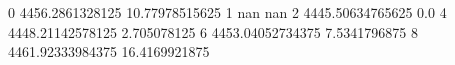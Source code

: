 0 4456.2861328125 10.77978515625
1 nan nan
2 4445.50634765625 0.0
4 4448.21142578125 2.705078125
6 4453.04052734375 7.5341796875
8 4461.92333984375 16.4169921875
